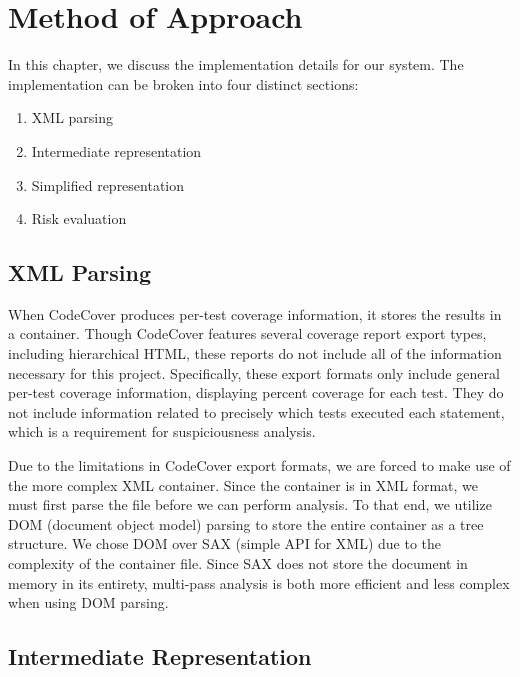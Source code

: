 %
%
%
\chapter{Method of Approach} \label{ch:method}
In this chapter, we discuss the implementation details for our system.  The
implementation can be broken into four distinct sections:

\begin{enumerate}
\item XML parsing
\item Intermediate representation
\item Simplified representation
\item Risk evaluation
\end{enumerate}

\section{XML Parsing} \label{sec:parse}

When CodeCover produces per-test coverage information, it stores the results in
a container.  Though CodeCover features several coverage report export types, 
including hierarchical HTML, these reports do not include all of the information
necessary for this project.  Specifically, these export formats only include
general per-test coverage information, displaying percent coverage for each test.
They do not include information related to precisely which tests executed each 
statement, which is a requirement for suspiciousness analysis.  

Due to the limitations in CodeCover export formats, we are forced to make use of
the more complex XML container.  Since the container is in XML format, we must
first parse the file before we can perform analysis.  To that end, we utilize
DOM (document object model) parsing to store the entire container as a tree structure.  
We chose DOM over SAX (simple API for XML) due to the complexity of the container file.
Since SAX does not store the document in memory in its entirety, multi-pass analysis
is both more efficient and less complex when using DOM parsing.

\section{Intermediate Representation} \label{sec:ir}


